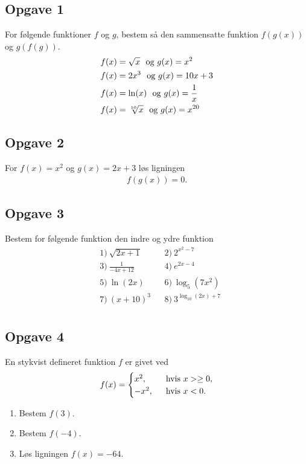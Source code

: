 \subsection*{Opgave 1}
For følgende funktioner $f$ og $g$, bestem så den sammensatte funktion $f(g(x))$ og $g(f(g))$.
\begin{align*}
&f(x) = \sqrt{x}\  \textnormal{ og } g(x) = x^2\\
&f(x) = 2x^3\  \textnormal{ og } g(x) = 10x+3\\
&f(x) = \ln(x)\  \textnormal{ og } g(x) = \frac{1}{x}\\
&f(x) = \sqrt[10]{x}\  \textnormal{ og } g(x) = x^{20}
\end{align*}
\subsection*{Opgave 2}
For $f(x) = x^2$ og $g(x)=2x+3$ løs ligningen
\begin{align*}
f(g(x)) = 0.
\end{align*}

\subsection*{Opgave 3}
Bestem for følgende funktion den indre og ydre funktion
\begin{align*}
	&1) \ \sqrt{2x+1}   &&2) \  2^{x^2-7}     \\
	&3) \ \frac{1}{-4x+12}   &&4) \ e^{2x-4}      \\
	&5) \ \ln(2x)   &&6) \  \log_5(7x^2)     \\
	&7) \ (x+10)^3   &&8) \  3^{\log_{10}(2x)+7}       \\
\end{align*}


\subsection*{Opgave 4}
En stykvist defineret funktion $f$ er givet ved
\begin{align*}
	f(x) = 
	\begin{cases}
		x^2, \ &\textnormal{ hvis } x > \geq 0,\\
		-x^2, \ &\textnormal{ hvis } x < 0.
	\end{cases}
\end{align*}
\begin{enumerate}[label=\roman*)]
	\item Bestem $f(3).$
	\item Bestem $f(-4).$
	\item Løs ligningen $f(x) = -64$.
\end{enumerate}

